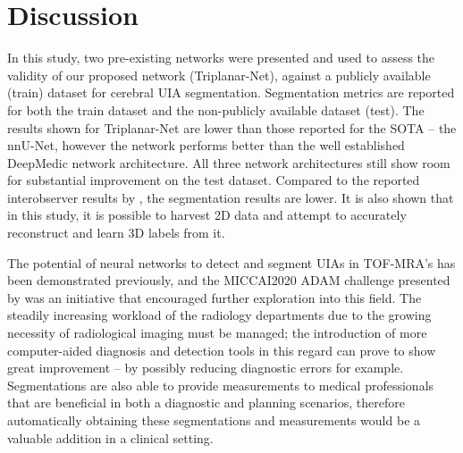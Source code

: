 \chapter{Discussion}
\label{chapter7}

In this study, two pre-existing networks were presented and used to assess the validity of our proposed network (Triplanar-Net), against a publicly available (train) dataset for cerebral UIA segmentation. Segmentation metrics are reported for both the train dataset and the non-publicly available dataset (test). The results shown for Triplanar-Net are lower than those reported for the SOTA -- the nnU-Net, however the network performs better than the well established DeepMedic network architecture. All three network architectures still show room for substantial improvement on the test dataset. Compared to the reported interobserver results by \citeauthor{Timmins2020}, the segmentation results are lower. It is also shown that in this study, it is possible to harvest 2D data and attempt to accurately reconstruct and learn 3D labels from it. 

The potential of neural networks to detect and segment UIAs in TOF-MRA's has been demonstrated previously, and the MICCAI2020 ADAM challenge presented by \citeauthor{Timmins2020} was an initiative that encouraged further exploration into this field. The steadily increasing workload of the radiology departments due to the growing necessity of radiological imaging must be managed; the introduction of more computer-aided diagnosis and detection tools in this regard can prove to show great improvement -- by possibly reducing diagnostic errors for example. Segmentations are also able to provide measurements to medical professionals that are beneficial in both a diagnostic and planning scenarios, therefore automatically obtaining these segmentations and measurements would be a valuable addition in a clinical setting.

